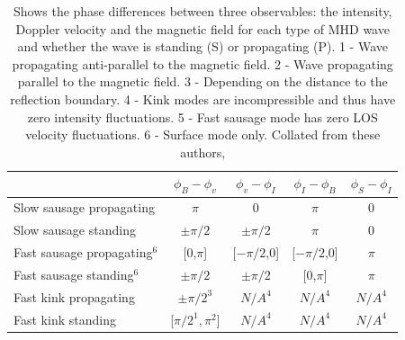     \begin{table}
        \centering
        \begin{tabular}{l|c|c|c|c}
            &$\phi_{{B}}-\phi_{{v}}$&$\phi_{{v}}-\phi_{{I}}$&$\phi_{{I}}-\phi_{{B}}$&$\phi_{{S}}-\phi_{{I}}$ \\ \hline\hline
        Slow sausage propagating        & $\pi$ & 0 & $\pi$ & 0 \\
        Slow sausage standing           & $\pm\pi/2$ & $\pm\pi/2$ & $\pi$ & 0 \\
        Fast sausage propagating$^6$    & [0,$\pi$] & [$-\pi/2$,0] & [$-\pi/2$,0] & $\pi$ \\
        Fast sausage standing$^6$       & $\pm\pi/2$ & $\pm\pi/2$ & [0,$\pi$] & $\pi$  \\
        Fast kink propagating       	& $\pm\pi/2^3$ & $N/A^4$ & $N/A^4$ & $N/A^4$ \\
        Fast kink standing          	& [$\pi/2^1,\pi^2$] & $N/A^4$ & $N/A^4$ & $N/A^4$ \\ \hline
        \end{tabular}
        \caption{
            Shows the phase differences between three observables: the intensity, Doppler velocity and the magnetic field for each type of MHD wave and whether the wave is standing (S) or propagating (P).
            1 - Wave propagating anti-parallel to the magnetic field.
            2 - Wave propagating parallel to the magnetic field. 
            3 - Depending on the distance to the reflection boundary.
            4 - Kink modes are incompressible and thus have zero intensity fluctuations.
            5 - Fast sausage mode has zero LOS velocity fluctuations.
            6 - Surface mode only.
            Collated from these authors, \cite{CLOO,PMHDW,Moreels2013,Moreels2013b,2015A&A...579A..73M}}
        \label{tab:phase}
    \end{table}
    
